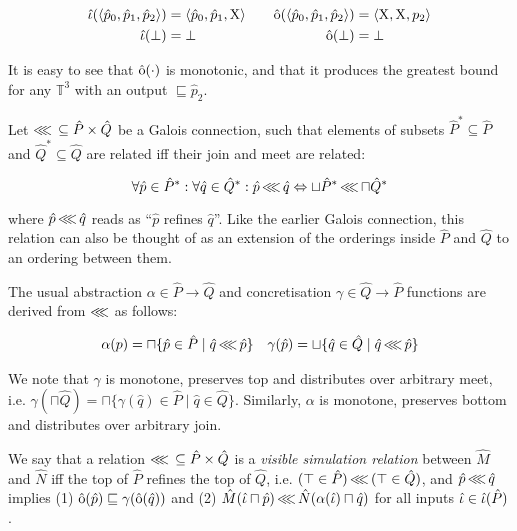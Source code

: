 \begin{equation*}
\begin{aligned}[t]
\operatorname{\hat{\iota}}(\langle \hat p_{0}, \hat p_{1}, \hat p_{2} \rangle) &= \langle \hat p_{0}, \hat p_{1}, \mathrm{X} \rangle \\
\operatorname{\hat{\iota}}(\bot) &= \bot
\end{aligned}
\qquad
\begin{aligned}[t]
\operatorname{\hat{\mathrm{o}}}(\langle \hat p_{0}, \hat p_{1}, \hat p_{2} \rangle) &= \langle \mathrm{X}, \mathrm{X}, p_{2} \rangle \\
\operatorname{\hat{\mathrm{o}}}(\bot) &= \bot
\end{aligned}
\end{equation*}

\noindent It is easy to see that $\operatorname{\hat{\mathrm{o}}}(\cdot)$ is monotonic, and that it produces the greatest bound for any $\mathbb{T}^{3}$ with an output $\sqsubseteq \hat p_{2}$.

Let $\operatorname{\lll} \, \subseteq \hat P \times \hat Q$ be a Galois connection, such that elements of subsets $\hat P^{*} \subseteq \hat P$ and $\hat Q^{*} \subseteq \hat Q$ are related iff their join and meet are related:

\begin{equation*}
\forall \hat p \in \hat P^{*} : \forall \hat q \in \hat Q^{*} : \hat p \operatorname{\lll} \hat q \Leftrightarrow \sqcup \hat P^{*} \operatorname{\lll} \sqcap \hat Q^{*}
\end{equation*}

\noindent where $\hat p \operatorname{\lll} \hat q$ reads as ``$\hat p$ refines $\hat q$''. Like the earlier Galois connection, this relation can also be thought of as an extension of the orderings inside $\hat P$ and $\hat Q$ to an ordering between them.

The usual abstraction $\alpha \in \hat P \rightarrow \hat Q$ and concretisation $\gamma \in \hat Q \rightarrow \hat P$ functions are derived from $\operatorname{\lll}$ as follows:

\begin{align*}
\alpha(p) = \sqcap \{ \hat p \in \hat P \mid \hat q \operatorname{\lll} \hat p \} && \gamma(\hat p) = \sqcup \{ \hat q \in \hat Q \mid \hat q \operatorname{\lll} \hat p \}
\end{align*}

\noindent We note that $\gamma$ is monotone, preserves top and distributes over arbitrary meet, i.e. $\gamma(\sqcap \hat Q) = \sqcap \{ \gamma(\hat q) \in \hat P \mid \hat q \in \hat Q\}$. Similarly, $\alpha$ is monotone, preserves bottom and distributes over arbitrary join.

We say that a relation $\operatorname{\lll} \, \subseteq \hat P \times \hat Q$ is a \textit{visible simulation relation} between $\hat M$ and $\hat N$ iff the top of $\hat P$ refines the top of $\hat Q$, i.e. $(\top \in \hat P) \operatorname{\lll} \, (\top \in \hat Q)$, and $\hat p \operatorname{\lll} \hat q$ implies (1) $\operatorname{\hat{\mathrm{o}}}(\hat p) \sqsubseteq \gamma(\operatorname{\hat{\mathrm{o}}}(\hat q))$ and (2) $\hat M(\hat \iota \sqcap \hat p) \operatorname{\lll} \hat N(\alpha(\hat \iota) \sqcap \hat q)$ for all inputs $\hat \iota \in \operatorname{\hat{\iota}}(\hat P)$.


